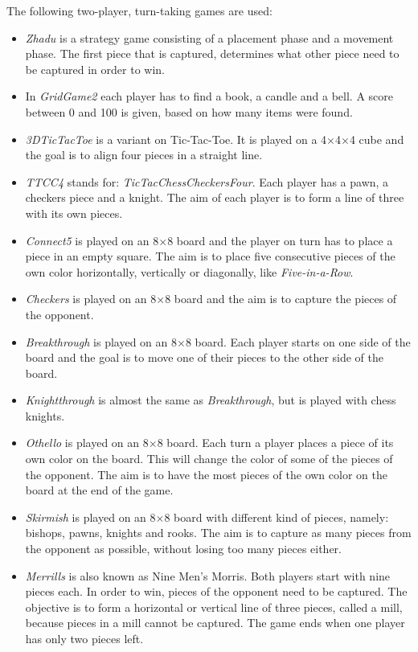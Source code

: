\documentclass[journal]{IEEEtran}
\begin{document}
The following two-player, turn-taking games are used:
\begin{itemize}
\item \textit{Zhadu} is a strategy game consisting of a placement phase and a movement phase. The first piece that is captured, determines what other piece need to be captured in order to win.
\item In \textit{GridGame2} each player has to find a book, a candle and a bell. A score between 0 and 100 is given, based on how many items were found.
\item \textit{3DTicTacToe} is a variant on Tic-Tac-Toe. It is played on a 4$\times$4$\times$4 cube and the goal is to align four pieces in a straight line.
\item \textit{TTCC4} stands for: \textit{TicTacChessCheckersFour}. Each player has a pawn, a checkers piece and a knight. The aim of each player is to form a line of three with its own pieces.
\item \textit{Connect5} is played on an 8$\times$8 board and the player on turn has to place a piece in an empty square. The aim is to place five consecutive pieces of the own color horizontally, vertically or diagonally, like %
\textit{Five-in-a-Row}.
\item \textit{Checkers} is played on an 8$\times$8 board and the aim is to capture the pieces of the opponent.
\item \textit{Breakthrough} is played on an 8$\times$8 board. Each player starts on one side of the board and the goal is to move one of their pieces to the other side of the board.
\item \textit{Knightthrough} is almost the same as \textit{Breakthrough}, but is played with chess knights.
\item \textit{Othello} is played on an 8$\times$8 board. Each turn a player places a piece  of its own color on the board. This will change the color of some of the pieces of the opponent. The aim is to have the most pieces of the own color on the board at the end of the game.
\item \textit{Skirmish} is played on an 8$\times$8 board with different kind of pieces, namely: bishops, pawns, knights and rooks. The aim is to capture as many pieces from the opponent as possible, without losing too many pieces either.
\item \textit{Merrills} is also known as Nine Men's Morris. Both players start with nine pieces each. In order to win, pieces of the opponent need to be captured. The objective is to form a horizontal or vertical line of three pieces, called a mill, because pieces in a mill cannot be captured. The game ends when one player has only two pieces left.

\end{itemize}
\end{document}
